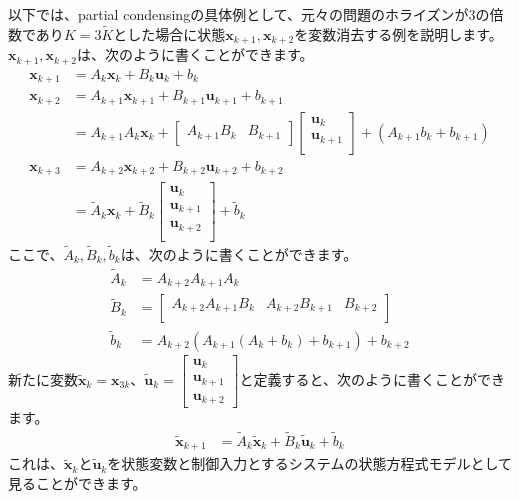 \documentclass[a4paper]{jarticle}
\begin{document}
以下では、partial condensingの具体例として、元々の問題のホライズンが3の倍数であり$K=3\tilde{K}$とした場合に状態$\mathbf{x}_{k+1},\mathbf{x}_{k+2}$を変数消去する例を説明します。
$\mathbf{x}_{k+1},\mathbf{x}_{k+2}$は、次のように書くことができます。
\begin{align*}
  \mathbf{x}_{k+1} &= A_k\mathbf{x}_k + B_k\mathbf{u}_k + b_k
  \\
  \mathbf{x}_{k+2} &= A_{k+1}\mathbf{x}_{k+1} + B_{k+1}\mathbf{u}_{k+1} + b_{k+1}
  \\
  &= A_{k+1}A_k\mathbf{x}_k + 
  \begin{bmatrix}
  A_{k+1}B_k & B_{k+1}
  \end{bmatrix}
  \begin{bmatrix}
  \mathbf{u}_k \\
  \mathbf{u}_{k+1} \\
  \end{bmatrix}  
  + \left( A_{k+1}b_k + b_{k+1} \right)
  \\
  \mathbf{x}_{k+3} &= A_{k+2}\mathbf{x}_{k+2} + B_{k+2}\mathbf{u}_{k+2} + b_{k+2}  
  \\
  &= 
  \tilde{A}_k \mathbf{x}_k + 
  \tilde{B}_k
  \begin{bmatrix}
  \mathbf{u}_k \\
  \mathbf{u}_{k+1} \\
  \mathbf{u}_{k+2} \\
  \end{bmatrix}
  +
  \tilde{b}_k
\end{align*}
ここで、$\tilde{A}_k,\tilde{B}_k,\tilde{b}_k$は、次のように書くことができます。
\begin{align*}
  \tilde{A}_k
  &= 
  A_{k+2}A_{k+1}A_k
  \\
  \tilde{B}_k
  &= 
  \begin{bmatrix}
  A_{k+2}A_{k+1}B_k & A_{k+2}B_{k+1} & B_{k+2}\\
  \end{bmatrix}
  \\
  \tilde{b}_k
  &= 
  A_{k+2}(A_{k+1}(A_k + b_k) + b_{k+1}) + b_{k+2}
\end{align*}
新たに変数$\tilde{\mathbf{x}}_k={\mathbf{x}}_{3k}$、$\tilde{\mathbf{u}}_k=  \begin{bmatrix}\mathbf{u}_k \\\mathbf{u}_{k+1} \\\mathbf{u}_{k+2} \end{bmatrix}$と定義すると、次のように書くことができます。
\begin{align}
  \tilde{\mathbf{x}}_{k+1}
  &= 
  \tilde{A}_k \tilde{\mathbf{x}}_k + 
  \tilde{B}_k \tilde{\mathbf{u}}_k
  +
  \tilde{b}_k
  \label{eq:partial_dense_state_eq_3}
\end{align}
これは、$\tilde{\mathbf{x}}_k$と$\tilde{\mathbf{u}}_k$を状態変数と制御入力とするシステムの状態方程式モデルとして見ることができます。
\end{document}
